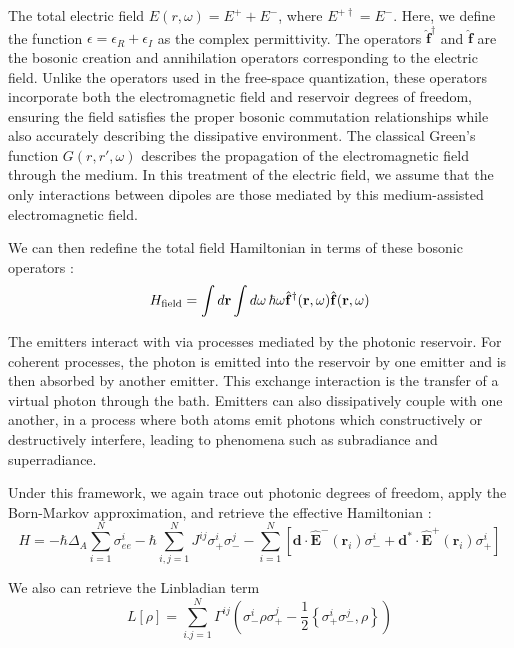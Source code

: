 \documentclass{article}
\begin{document}
The total electric field $E(r,\omega) = E^+ + E^-$, where $E^{+\dagger} = E^-$. Here, we define the function $\epsilon = \epsilon_R + \epsilon_I$ as the complex
permittivity. The operators $\hat{\mathbf{f}}^\dagger$ and $\hat{\mathbf{f}}$ are the
bosonic creation and annihilation operators corresponding to the electric field.
Unlike the operators used in the free-space quantization, these operators incorporate
both the electromagnetic field and reservoir degrees of freedom, ensuring the field
satisfies the proper bosonic commutation relationships while also accurately
describing the dissipative environment.
The classical Green's
function $G(r, r', \omega)$ describes the propagation of the electromagnetic field
through the medium. In this treatment of the electric
field, we assume that the only interactions between dipoles are those mediated by this
medium-assisted electromagnetic field.

We can then redefine the total field Hamiltonian in terms of these bosonic operators
\cite{huttner_quantization_1992,knoll_qed_2000}:
\begin{equation}
  H_{\mathrm{field}} = \int d{\bf r}\int d\omega\, \hbar\omega
  \hat{\mathbf{f}}^\dagger(\mathbf{r},\omega)\hat{\mathbf{f}}(\mathbf{r}, \omega)
\end{equation}


The emitters interact with via processes mediated by the photonic reservoir. For
coherent processes, the photon is emitted into the reservoir by one emitter and is
then absorbed by another emitter. This exchange interaction is the transfer of a
virtual photon through the bath. Emitters can also dissipatively couple with one
another, in a process where both atoms emit photons which constructively or
destructively interfere, leading to phenomena such as subradiance and superradiance.

Under this framework, we again trace out photonic degrees of freedom, apply the
Born-Markov approximation, and retrieve the effective Hamiltonian
\cite{dung_resonant_2002, chang_cavity_2012,chang_trapping_2014}:
\begin{equation}
  H = -\hbar \Delta_A \sum_{i=1}^N \sigma_{ee}^i - \hbar\sum_{i,j=1}^N
  J^{ij}\sigma_+^i\sigma_-^j - \sum_{i=1}^N[\mathbf{d} \cdot
  \hat{\mathbf{E}}^-(\mathbf{r}_i)\sigma_-^i + \mathbf{d}^*\cdot
  \hat{\mathbf{E}}^+(\mathbf{r}_i)\sigma_+^i]
\end{equation}

We also can retrieve the Linbladian term
\begin{equation}
  L[\rho] = \sum_{i.j=1}^N \Gamma^{ij}\left( \sigma_-^i\rho\sigma_+^j - \frac{1}{2}
  \left\{\sigma_+^i\sigma_-^j, \rho\right\} \right)
\end{equation}
\end{document}
